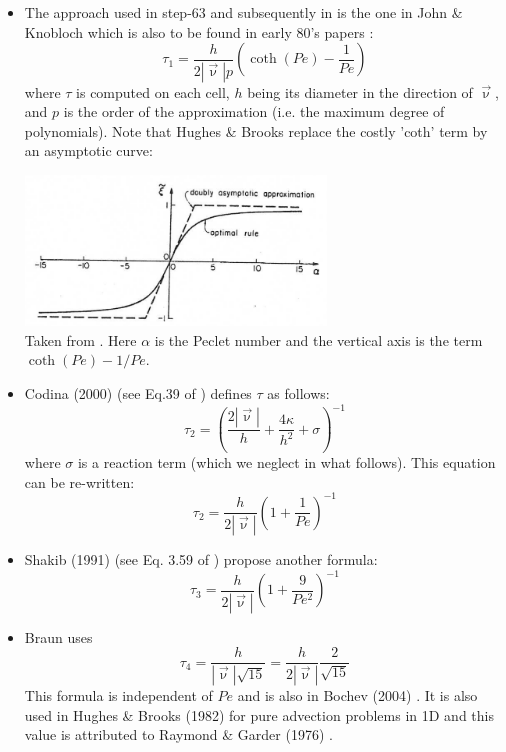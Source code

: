\begin{itemize}
\item The approach used in step-63 and subsequently in \aspect{} is the 
one in John \& Knobloch \cite{jokn06,knob08} which is also to be found in early 
80's papers \cite{brhu82,hubr82}:
\[
\tau_1 = \frac{h}{2 |\vec\upnu| p} \left( \coth (Pe) - \frac{1}{Pe} \right)
\]
where $\tau$ is computed on each cell, $h$ being its diameter in the direction of $\vec\upnu$, 
and $p$ is the order of the approximation (i.e. the maximum degree of polynomials).
Note that Hughes \& Brooks \cite{hubr82} replace the costly 'coth' term by an asymptotic curve:

\begin{center}
\includegraphics[width=8cm]{images/supg/hubr82}\\
{\captionfont Taken from \cite{hubr82}. Here $\alpha$ is the Peclet number and the vertical axis
is the term $ \coth (Pe) -1/Pe$.}
\end{center}


\item
Codina (2000) (see Eq.39 of \cite{codi00}) defines $\tau$ as follows:
\[
\tau_2= \left( \frac{2 |\vec\upnu|}{h} + \frac{4 \kappa}{h^2} + \sigma   \right)^{-1}
\]
where $\sigma$ is a reaction term (which we neglect in what follows). This equation 
can be re-written:
\[
\tau_2= \frac{h}{2 |\vec\upnu|} \left( 1 + \frac{1}{Pe} \right)^{-1}
\]

\item
Shakib \etal (1991) (see Eq. 3.59 of \cite{shhj91}) propose another formula:
\[
\tau_3= \frac{h}{2 |\vec\upnu|} \left( 1 + \frac{9}{Pe^2} \right)^{-1}
\]

\item
Braun \cite{brau03} uses 
\[
\tau_4 = \frac{h}{|\vec\upnu| \sqrt{15}} = \frac{h}{2|\vec\upnu|} \frac{2}{\sqrt{15}} 
\]
This formula is independent of $Pe$ and is also in Bochev \etal (2004) \cite{bogs04}.
It is also used in Hughes \& Brooks (1982) \cite{hubr82} for pure advection problems in 1D
and this value is attributed to Raymond \& Garder (1976)  \cite{raga76}.


\end{itemize}
